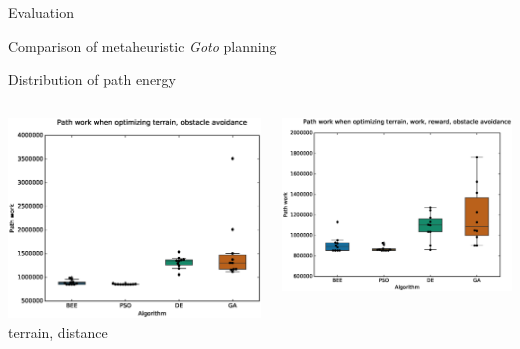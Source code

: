 \documentclass[9pt]{beamer}
\begin{document}
\begin{frame}{Evaluation}
    \begin{block}{Comparison of metaheuristic \textit{Goto} planning}
    \end{block}
    \begin{block}{Distribution of path energy}
        \begin{columns}
            \begin{column}{0.5\textwidth}
                \begin{center}
                    \includegraphics[width=\textwidth,trim={.75cm .75cm 0cm 1cm},clip]{img/EXP3_histo_work_a.eps}
                    \linebreak
                    terrain, distance
                \end{center}
            \end{column}
            \begin{column}{0.5\textwidth}
                \begin{center}
                    \includegraphics[width=\textwidth,trim={.75cm .75cm 0cm 1cm},clip]{img/EXP3_histo_work_b.eps}

\end{center}
\end{column}
\end{columns}
\end{block}
\end{frame}
\end{document}
